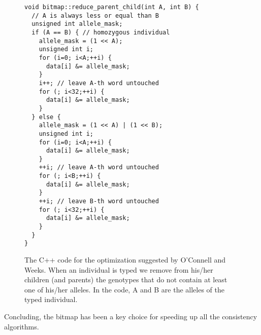 \begin{figure}
  \centering
\begin{lstlisting}
void bitmap::reduce_parent_child(int A, int B) {
  // A is always less or equal than B
  unsigned int allele_mask;
  if (A == B) { // homozygous individual
    allele_mask = (1 << A);
    unsigned int i;
    for (i=0; i<A;++i) {
      data[i] &= allele_mask;
    }
    i++; // leave A-th word untouched
    for (; i<32;++i) {
      data[i] &= allele_mask;
    }
  } else {
    allele_mask = (1 << A) | (1 << B); 
    unsigned int i;
    for (i=0; i<A;++i) {
      data[i] &= allele_mask;
    }
    ++i; // leave A-th word untouched
    for (; i<B;++i) {
      data[i] &= allele_mask;
    }
    ++i; // leave B-th word untouched
    for (; i<32;++i) {
      data[i] &= allele_mask;
    }
  }  
}
\end{lstlisting}  
  \caption{The C++ code for the optimization suggested by O'Connell and
    Weeks. When an individual is typed we remove from his/her children (and parents) the
    genotypes that do not contain at least one of his/her alleles. In the code,
    A and B are the alleles of the typed individual.}
  \label{fig:remove}
\end{figure}
  
Concluding, the bitmap has been a key choice for speeding up all the consistency
algorithms.

